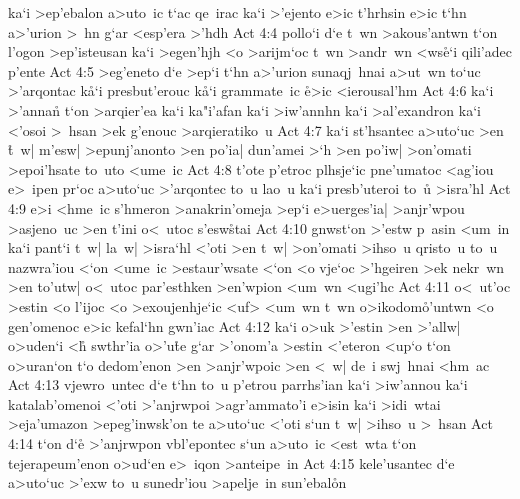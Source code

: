 ka`i
>ep'ebalon
a>uto~ic
t`ac
qe~irac
ka`i
>'ejento
e>ic
t'hrhsin
e>ic
t`hn
a>'urion
>~hn
g`ar
<esp'era
>'hdh\bibvsend
\vs Act 4:4
pollo`i
d`e
t~wn
>akous'antwn
t`on
l'ogon
>ep'isteusan
ka`i
>egen'hjh
<o
>arijm`oc
t~wn
>andr~wn
<ws\r{e}`i
qili'adec
p'ente\bibvsend
\vs Act 4:5
>eg'eneto
d`e
>ep`i
t`hn
a>'urion
sunaqj~hnai
a>ut~wn
to`uc
>'arqontac
k\r{a}`i
presbut'erouc
k\r{a}`i
grammate~ic
\r{e}>ic
<ierousal'hm\bibvsend
\vs Act 4:6
ka`i
>'annan\r{}
t`on
>arqier'ea
ka`i
ka"i'afan
ka`i
>iw'annhn
ka`i
>al'exandron
ka`i
<'osoi
>~hsan
>ek
g'enouc
>arqieratiko~u\bibvsend
\vs Act 4:7
ka`i
st'hsantec
a>uto`uc
>en
\r{t}~w|
m'esw|
>epunj'anonto
>en
po'ia|
dun'amei
>`h
>en
po'iw|
>on'omati
>epoi'hsate
to~uto
<ume~ic\bibvsend
\vs Act 4:8
t'ote
p'etroc
plhsje`ic
pne'umatoc
<ag'iou
e>~ipen
pr`oc
a>uto`uc
>'arqontec
to~u
lao~u
ka`i
presb'uteroi
to~u\r{}
>isra'hl\bibvsend
\vs Act 4:9
e>i
<hme~ic
s'hmeron
>anakrin'omeja
>ep`i
e>uerges'ia|
>anjr'wpou
>asjeno~uc
>en
t'ini
o<~utoc
s'esw\r{s}tai\bibvsend
{}
\vs Act 4:10
gnwst`on
>'estw
p~asin
<um~in
ka`i
pant`i
t~w|
la~w|
>isra`hl
<'oti
>en
t~w|
>on'omati
>ihso~u
qristo~u
to~u
nazwra'iou
<`on
<ume~ic
>estaur'wsate
<`on
<o
vje`oc
>'hgeiren
>ek
nekr~wn
>en
to'utw|
o<~utoc
par'esthken
>en'wpion
<um~wn
<ugi'hc\bibvsend
\vs Act 4:11
o<~ut'oc
>estin
<o
l'ijoc
<o
>exoujenhje`ic
<uf>
<um~wn
t~wn
o>ikodom\r{o}'untwn
<o
gen'omenoc
e>ic
kefal`hn
gwn'iac\bibvsend
\vs Act 4:12
ka`i
o>uk
>'estin
>en
>'allw|
o>uden`i
<h\r{}
swthr'ia
o>'u\r{t}e
g`ar
>'onom'a
>estin
<'eteron
<up`o
t`on
o>uran`on
t`o
dedom'enon
>en
>anjr'wpoic
>en
<~w|
de~i
swj~hnai
<hm~ac\bibvsend
\vs Act 4:13
vjewro~untec
d`e
t`hn
to~u
p'etrou
parrhs'ian
ka`i
>iw'annou
ka`i
katalab'omenoi
<'oti
>'anjrwpoi
>agr'ammato'i
e>isin
ka`i
>idi~wtai
>eja'umazon
>epeg'inwsk'on
te
a>uto`uc
<'oti
s`un
t~w|
>ihso~u
>~hsan\bibvsend
\vs Act 4:14
t`on
d`e\r{}
>'anjrwpon
vbl'epontec
s`un
a>uto~ic
<est~wta
t`on
tejerapeum'enon
o>ud`en
e>~iqon
>anteipe~in\bibvsend
\vs Act 4:15
kele'usantec
d`e
a>uto`uc
>'exw
to~u
sunedr'iou
>apelje~in
sun'ebal\r{o}n
